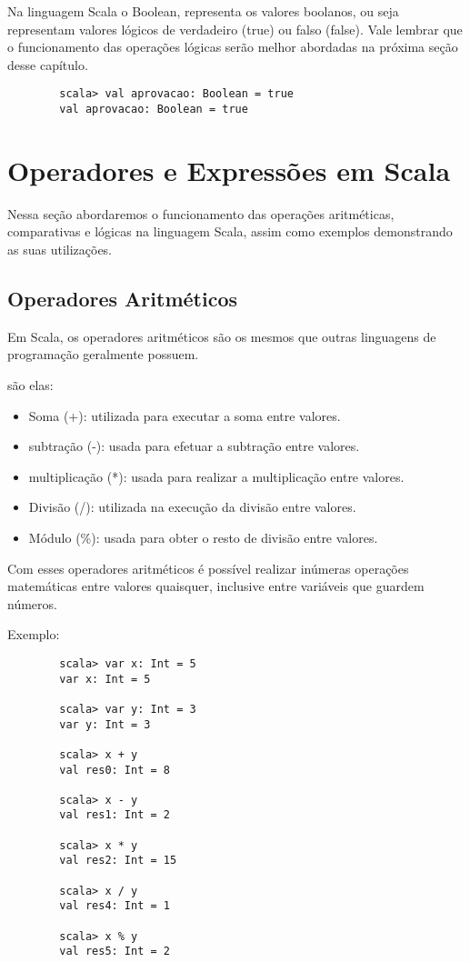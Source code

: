     Na linguagem Scala o Boolean, representa os valores boolanos, ou seja representam valores l\'{o}gicos de verdadeiro (true) ou falso (false). Vale lembrar que o funcionamento das opera\c{c}\~{o}es l\'{o}gicas serão melhor abordadas na próxima seção desse cap\'{i}tulo.
    
    \begin{lstlisting}
    	scala> val aprovacao: Boolean = true
    	val aprovacao: Boolean = true
    \end{lstlisting}
    
    \section{Operadores e Express\~{o}es em Scala}
	
	Nessa seção abordaremos o funcionamento das opera\c{c}\~{o}es aritm\'{e}ticas, comparativas e l\'{o}gicas na linguagem Scala, assim como exemplos demonstrando as suas utilizações.
	
	\subsection{Operadores Aritm\'{e}ticos}
	Em Scala, os operadores aritm\'{e}ticos s\~{a}o os mesmos que outras linguagens de programa\c{c}\~{a}o geralmente possuem. 
	
	s\~{a}o elas:
	\begin{itemize}
		\item Soma (+): utilizada para executar a soma entre valores.
		\item subtra\c{c}\~{a}o (-): usada para efetuar a subtra\c{c}\~{a}o entre valores.
		\item multiplica\c{c}\~{a}o (*): usada para realizar a multiplica\c{c}\~{a}o entre valores.
		\item Divis\~{a}o (/): utilizada na execução da divis\~{a}o entre valores.
		\item Módulo (\%): usada para obter o resto de divis\~{a}o entre valores.
	\end{itemize}

	Com esses operadores aritm\'{e}ticos \'{e} poss\'{i}vel realizar in\'{u}meras opera\c{c}\~{o}es matemáticas entre valores quaisquer, inclusive entre vari\'{a}veis que guardem n\'{u}meros.
	
	Exemplo:
	
	\begin{lstlisting}
		scala> var x: Int = 5
		var x: Int = 5
		
		scala> var y: Int = 3
		var y: Int = 3
		
		scala> x + y
		val res0: Int = 8
		
		scala> x - y
		val res1: Int = 2
		
		scala> x * y
		val res2: Int = 15
		
		scala> x / y
		val res4: Int = 1
		
		scala> x % y
		val res5: Int = 2
	\end{lstlisting}

